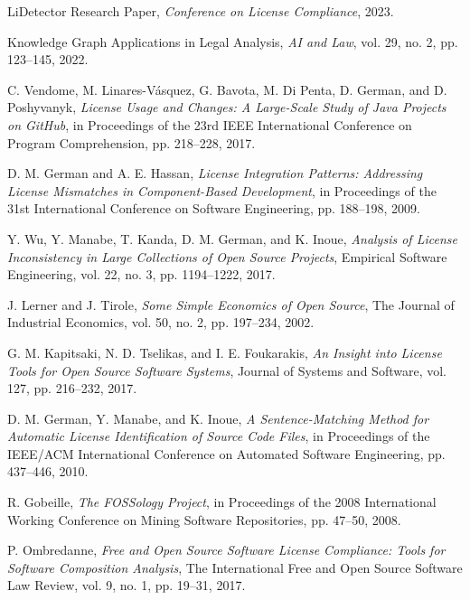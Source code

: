 \documentclass[9pt,twocolumn]{article}
\begin{document}
\balance

\begin{thebibliography}{15}

LiDetector Research Paper, 
\textit{Conference on License Compliance}, 2023.

Knowledge Graph Applications in Legal Analysis, 
\textit{AI and Law}, vol. 29, no. 2, pp. 123--145, 2022.

C. Vendome, M. Linares-Vásquez, G. Bavota, M. Di Penta, D. German, and D. Poshyvanyk,
\textit{License Usage and Changes: A Large-Scale Study of Java Projects on GitHub},
in Proceedings of the 23rd IEEE International Conference on Program Comprehension,
pp. 218--228, 2017.

D. M. German and A. E. Hassan,
\textit{License Integration Patterns: Addressing License Mismatches in Component-Based Development},
in Proceedings of the 31st International Conference on Software Engineering,
pp. 188--198, 2009.

Y. Wu, Y. Manabe, T. Kanda, D. M. German, and K. Inoue,
\textit{Analysis of License Inconsistency in Large Collections of Open Source Projects},
Empirical Software Engineering, vol. 22, no. 3, pp. 1194--1222, 2017.

J. Lerner and J. Tirole,
\textit{Some Simple Economics of Open Source},
The Journal of Industrial Economics, vol. 50, no. 2, pp. 197--234, 2002.

G. M. Kapitsaki, N. D. Tselikas, and I. E. Foukarakis,
\textit{An Insight into License Tools for Open Source Software Systems},
Journal of Systems and Software, vol. 127, pp. 216--232, 2017.

D. M. German, Y. Manabe, and K. Inoue,
\textit{A Sentence-Matching Method for Automatic License Identification of Source Code Files},
in Proceedings of the IEEE/ACM International Conference on Automated Software Engineering,
pp. 437--446, 2010.

R. Gobeille,
\textit{The FOSSology Project},
in Proceedings of the 2008 International Working Conference on Mining Software Repositories,
pp. 47--50, 2008.

P. Ombredanne,
\textit{Free and Open Source Software License Compliance: Tools for Software Composition Analysis},
The International Free and Open Source Software Law Review, vol. 9, no. 1, pp. 19--31, 2017.


\end{thebibliography}
\end{document}
